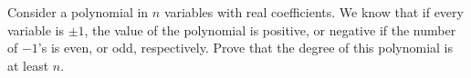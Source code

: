Consider a polynomial in $n$ variables with real coefficients. We know that if every variable is $\pm1$, the value of the polynomial is positive, or negative if the number of $-1$'s is even, or odd, respectively. Prove that the degree of this polynomial is at least $n$.